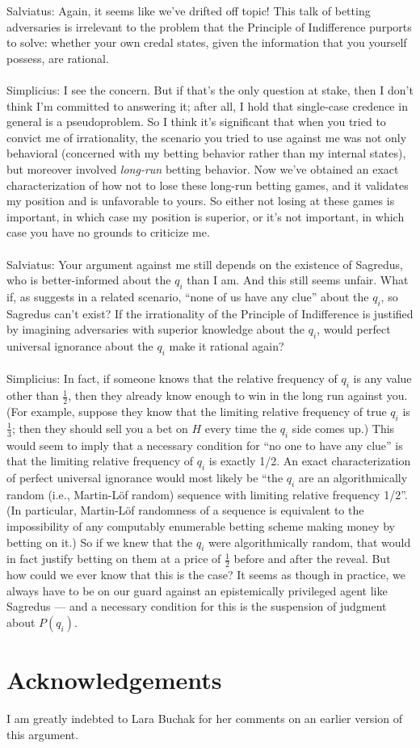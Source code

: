 \documentclass[letterpaper,12pt]{article}
\begin{document}
Salviatus: Again, it seems like we've drifted off topic! This talk of betting adversaries is irrelevant to the problem that the Principle of Indifference purports to solve: whether your own credal states, given the information that you yourself possess, are rational.\\ \\
Simplicius: I see the concern. But if that's the only question at stake, then I don't think I'm committed to answering it; after all, I hold that single-case credence in general is a pseudoproblem. So I think it's significant that when you tried to convict me of irrationality, the scenario you tried to use against me was not only behavioral (concerned with my betting behavior rather than my internal states), but moreover involved \emph{long-run} betting behavior. Now we've obtained an exact characterization of how not to lose these long-run betting games, and it validates my position and is unfavorable to yours. So either not losing at these games is important, in which case my position is superior, or it's not important, in which case you have no grounds to criticize me.\\ \\
Salviatus: Your argument against me still depends on the existence of Sagredus, who is better-informed about the $q_i$ than I am. And this still seems unfair. What if, as \citet[182]{White2009-WHIESA} suggests in a related scenario, ``none of us have any clue'' about the $q_i$, so Sagredus can't exist? If the irrationality of the Principle of Indifference is justified by imagining adversaries with superior knowledge about the $q_i$, would perfect universal ignorance about the $q_i$ make it rational again?\\ \\
Simplicius: In fact, if someone knows that the relative frequency of $q_i$ is any value other than $\frac{1}{2}$, then they already know enough to win in the long run against you. (For example, suppose they know that the limiting relative frequency of true $q_i$ is $\frac{1}{3}$; then they should sell you a bet on $H$ every time the $q_i$ side comes up.) This would seem to imply that a necessary condition for ``no one to have any clue'' is that the limiting relative frequency of $q_i$ is exactly 1/2. An exact characterization of perfect universal ignorance would most likely be ``the $q_i$ are an algorithmically random (i.e., Martin-L\"of random) sequence with limiting relative frequency 1/2''. (In particular, Martin-L\"of randomness of a sequence is equivalent to the impossibility of any computably enumerable betting scheme making money by betting on it.) So if we knew that the $q_i$ were algorithmically random, that would in fact justify betting on them at a price of $\frac{1}{2}$ before and after the reveal. But how could we ever know that this is the case? It seems as though in practice, we always have to be on our guard against an epistemically privileged agent like Sagredus --- and a necessary condition for this is the suspension of judgment about $P(q_i)$.

\section*{Acknowledgements}
I am greatly indebted to Lara Buchak for her comments on an earlier version of this argument.


\end{document}
